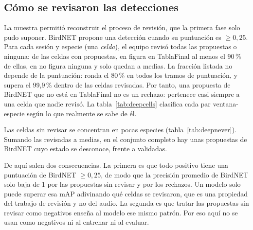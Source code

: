 \subsection{Cómo se revisaron las detecciones}\label{sec:celdas}
La muestra permitió reconstruir el proceso de revisión, que la primera fase solo pudo suponer. BirdNET propone una detección cuando su
puntuación es $\geq 0{,}25$. Para cada sesión y especie (una \emph{celda}), el equipo revisó todas las propuestas o ninguna:
de las \deepCellsTotal{} celdas con propuestas, en \deepCellsReviewed{} figura en TablaFinal al menos el 90\,\% de ellas, en \deepCellsNever{} no figura
ninguna y solo \deepCellsPartial{} quedan a medias. La fracción listada no depende de la puntuación: ronda el 80\,\% en todos los tramos de
puntuación, y supera el 99,9\,\% dentro de las celdas revisadas. Por tanto, una propuesta de BirdNET que no está en TablaFinal no es un
rechazo: pertenece casi siempre a una celda que nadie revisó. La tabla~\ref{tab:deepcells} clasifica cada par ventana-especie según lo que
realmente se sabe de él.

\begin{table}[H]
  \centering\small
  \caption{Categorías de los pares ventana-especie de la muestra y uso que se les da al entrenar y al evaluar.}\label{tab:deepcells}
\end{table}

Las celdas sin revisar se concentran en pocas especies (tabla~\ref{tab:deepnever}). Sumando las revisadas a medias, en el conjunto completo hay unas
\deepCatUWeighted{} propuestas de BirdNET cuyo estado se desconoce, frente a \deepCatPWeighted{} validadas.

\begin{table}[H]
  \centering\small
  \caption{Celdas sesión-especie en las que ninguna propuesta de BirdNET figura en TablaFinal. La última columna estima cuántas propuestas contienen
  en el conjunto completo.}\label{tab:deepnever}
\end{table}

De aquí salen dos consecuencias. La primera es que todo positivo tiene una puntuación de BirdNET $\geq 0{,}25$, de modo que la precisión
promedio de BirdNET solo baja de 1 por las \deepCatU{} propuestas sin revisar y por los \deepCatH{} rechazos. Un modelo solo puede superar esa mAP
adivinando qué celdas se revisaron, que es una propiedad del trabajo de revisión y no del audio. La segunda es que tratar las propuestas sin
revisar como negativos enseña al modelo ese mismo patrón. Por eso aquí no se usan como negativos ni al entrenar ni al evaluar.

